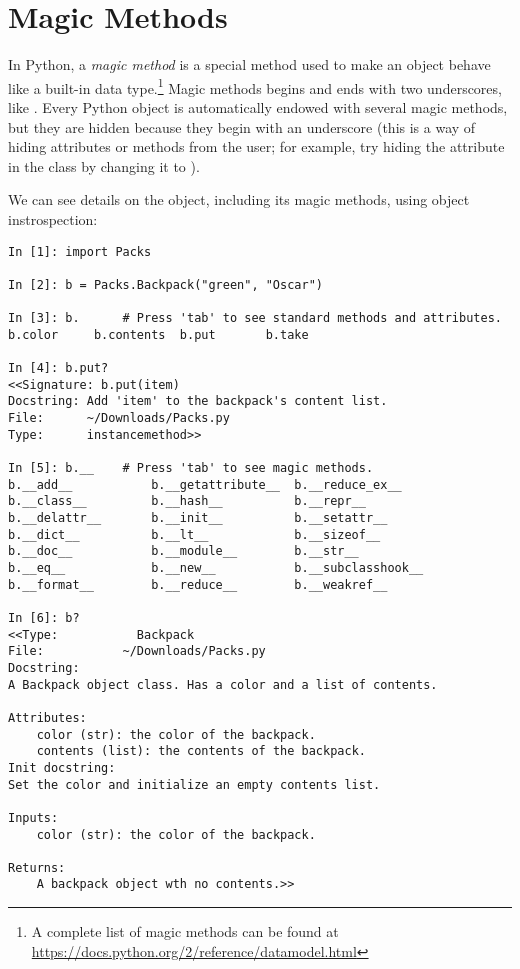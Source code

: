 \section*{Magic Methods}

In Python, a \emph{magic method} is a special method used to make an object behave like a built-in data type.\footnote{A complete list of magic methods can be found at \url{https://docs.python.org/2/reference/datamodel.html}}%
Magic methods begins and ends with two underscores, like .
Every Python object is automatically endowed with several magic methods, but they are hidden because they begin with an underscore (this is a way of hiding attributes or methods from the user; for example, try hiding the  attribute in the  class by changing it to ).

We can see details on the  object, including its magic methods, using object instrospection:

\begin{lstlisting}
In [1]: import Packs

In [2]: b = Packs.Backpack("green", "Oscar")

In [3]: b.      # Press 'tab' to see standard methods and attributes.
b.color     b.contents  b.put       b.take

In [4]: b.put?
<<Signature: b.put(item)
Docstring: Add 'item' to the backpack's content list.
File:      ~/Downloads/Packs.py
Type:      instancemethod>>

In [5]: b.__	# Press 'tab' to see magic methods.
b.__add__           b.__getattribute__  b.__reduce_ex__
b.__class__         b.__hash__          b.__repr__
b.__delattr__       b.__init__          b.__setattr__
b.__dict__          b.__lt__            b.__sizeof__
b.__doc__           b.__module__        b.__str__
b.__eq__            b.__new__           b.__subclasshook__
b.__format__        b.__reduce__        b.__weakref__

In [6]: b?
<<Type:           Backpack
File:           ~/Downloads/Packs.py
Docstring:
A Backpack object class. Has a color and a list of contents.

Attributes:
    color (str): the color of the backpack.
    contents (list): the contents of the backpack.
Init docstring:
Set the color and initialize an empty contents list.

Inputs:
    color (str): the color of the backpack.

Returns:
    A backpack object wth no contents.>>
\end{lstlisting}

